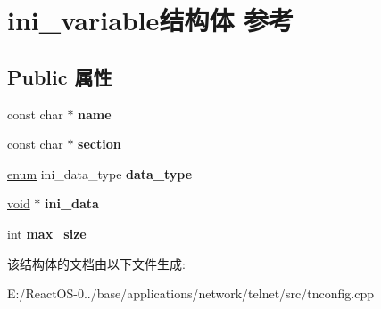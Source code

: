 \hypertarget{structini__variable}{}\section{ini\+\_\+variable结构体 参考}
\label{structini__variable}
\subsection*{Public 属性}
\begin{DoxyCompactItemize}
\item 
\mbox{\label{structini__variable_a4399a72b6299f9ecd116a337648bd029}} 
const char $\ast$ {\bfseries name}
\item 
\mbox{\label{structini__variable_abdb2509c7c33d0212663c7da2d96af3d}} 
const char $\ast$ {\bfseries section}
\item 
\mbox{\label{structini__variable_ab2f54089b9cf7f6b22f9b68e08b22015}} 
\hyperlink{interfaceenum}{enum} ini\+\_\+data\+\_\+type {\bfseries data\+\_\+type}
\item 
\mbox{\label{structini__variable_a7a48efc563994c8cf4971505fb605e2d}} 
\hyperlink{interfacevoid}{void} $\ast$ {\bfseries ini\+\_\+data}
\item 
\mbox{\label{structini__variable_a53c90ba271357a339e1798c6dadf0284}} 
int {\bfseries max\+\_\+size}
\end{DoxyCompactItemize}


该结构体的文档由以下文件生成\+:\begin{DoxyCompactItemize}
\item 
E\+:/\+React\+O\+S-\/0../base/applications/network/telnet/src/tnconfig.\+cpp\end{DoxyCompactItemize}
